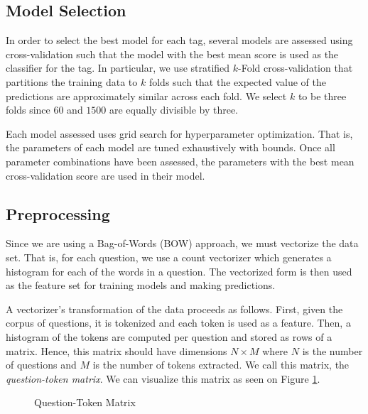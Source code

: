 \documentclass{sig-alternate}
\begin{document}
	\subsection{Model Selection} %
	\label{sub:Model Selection}
		In order to select the best model for each tag, several models are
		assessed using cross-validation such that the model with the best mean
		score is used as the classifier for the tag. In particular, we use
		stratified $k$-Fold cross-validation that partitions the training data to
		$k$ folds such that the expected value of the predictions are
		approximately similar across each fold. We select $k$ to be three folds
		since $60$ and $1500$ are equally divisible by three.
	
		Each model assessed uses grid search for hyperparameter optimization.
		That is, the parameters of each model are tuned exhaustively with
		bounds. Once all parameter combinations have been assessed, the
		parameters with the best mean cross-validation score are used in their
		model.

	\subsection{Preprocessing} %
	\label{sub:Preprocessing}
		Since we are using a Bag-of-Words (BOW) approach, we must vectorize the
		data set. That is, for each question, we use a count vectorizer which
		generates a histogram for each of the words in a question. The
		vectorized form is then used as the feature set for training models and
		making predictions.

		A vectorizer's transformation of the data proceeds as follows. First,
		given the corpus of questions, it is tokenized and each token is used
		as a feature. Then, a histogram of the tokens are computed per question
		and stored as rows of a matrix. Hence, this matrix should have dimensions
		$N\times M$ where $N$ is the number of questions and $M$ is the number
		of tokens extracted. We call this matrix, the \emph{question-token
		matrix}. We can visualize this matrix as seen on Figure
		\ref{fig:vectorized_output}.
		\begin{figure}[htbp]
			\centering
			\caption{Question-Token Matrix}
			\label{fig:vectorized_output}
		\end{figure}
\end{document}
